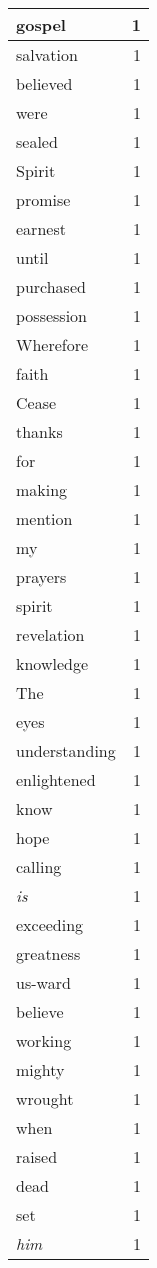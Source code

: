 \begin{center}
\begin{longtable}{l|r}
gospel & 1\\ \hline 
salvation & 1\\ \hline 
believed & 1\\ \hline 
were & 1\\ \hline 
sealed & 1\\ \hline 
Spirit & 1\\ \hline 
promise & 1\\ \hline 
earnest & 1\\ \hline 
until & 1\\ \hline 
purchased & 1\\ \hline 
possession & 1\\ \hline 
Wherefore & 1\\ \hline 
faith & 1\\ \hline 
Cease & 1\\ \hline 
thanks & 1\\ \hline 
for & 1\\ \hline 
making & 1\\ \hline 
mention & 1\\ \hline 
my & 1\\ \hline 
prayers & 1\\ \hline 
spirit & 1\\ \hline 
revelation & 1\\ \hline 
knowledge & 1\\ \hline 
The & 1\\ \hline 
eyes & 1\\ \hline 
understanding & 1\\ \hline 
enlightened & 1\\ \hline 
know & 1\\ \hline 
hope & 1\\ \hline 
calling & 1\\ \hline 
\emph{is} & 1\\ \hline 
exceeding & 1\\ \hline 
greatness & 1\\ \hline 
us-ward & 1\\ \hline 
believe & 1\\ \hline 
working & 1\\ \hline 
mighty & 1\\ \hline 
wrought & 1\\ \hline 
when & 1\\ \hline 
raised & 1\\ \hline 
dead & 1\\ \hline 
set & 1\\ \hline 
\emph{him} & 1\\ \hline 

\end{longtable}
\end{center}
